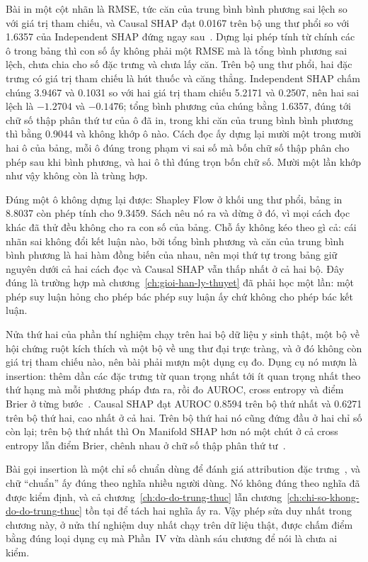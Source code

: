 Bài in một cột nhãn là RMSE, tức căn của trung bình bình phương sai lệch so với
giá trị tham chiếu, và Causal SHAP đạt 0.0167 trên bộ ung thư phổi so với
1.6357 của Independent SHAP đứng ngay sau~\autocite{p29causalshap}. Dựng lại
phép tính từ chính các ô trong bảng thì con số ấy không phải một RMSE mà là
tổng bình phương sai lệch, chưa chia cho số đặc trưng và chưa lấy căn. Trên bộ
ung thư phổi, hai đặc trưng có giá trị tham chiếu là hút thuốc và căng thẳng.
Independent SHAP chấm chúng 3.9467 và 0.1031 so với hai giá trị tham chiếu
5.2171 và 0.2507, nên hai sai lệch là $-1.2704$ và $-0.1476$; tổng bình phương
của chúng bằng 1.6357, đúng tới chữ số thập phân thứ tư của ô đã in, trong khi
căn của trung bình bình phương thì bằng 0.9044 và không khớp ô nào. Cách đọc ấy
dựng lại mười một trong mười hai ô của bảng, mỗi ô đúng trong phạm vi sai số mà
bốn chữ số thập phân cho phép sau khi bình phương, và hai ô thì đúng trọn bốn
chữ số. Mười một lần khớp như vậy không còn là trùng hợp.

Đúng một ô không dựng lại được: Shapley Flow ở khối ung thư phổi, bảng in
8.8037 còn phép tính cho 9.3459. Sách nêu nó ra và dừng ở đó, vì mọi cách đọc
khác đã thử đều không cho ra con số của bảng. Chỗ ấy không kéo theo gì cả: cái
nhãn sai không đổi kết luận nào, bởi tổng bình phương và căn của trung bình
bình phương là hai hàm đồng biến của nhau, nên mọi thứ tự trong bảng giữ nguyên
dưới cả hai cách đọc và Causal SHAP vẫn thấp nhất ở cả hai bộ. Đây đúng là
trường hợp mà chương~\ref{ch:gioi-han-ly-thuyet} đã phải học một lần: một phép
suy luận hỏng cho phép bác phép suy luận ấy chứ không cho phép bác kết luận.

%
Nửa thứ hai của phần thí nghiệm chạy trên hai bộ dữ liệu y sinh thật, một bộ về
hội chứng ruột kích thích và một bộ về ung thư đại trực tràng, và ở đó không
còn giá trị tham chiếu nào, nên bài phải mượn một dụng cụ đo. Dụng cụ nó mượn
là insertion: thêm dần các đặc trưng từ quan trọng nhất tới ít quan trọng nhất
theo thứ hạng mà mỗi phương pháp đưa ra, rồi đo AUROC, cross entropy và điểm
Brier ở từng bước~\autocite{p29causalshap}. Causal SHAP đạt AUROC 0.8594 trên
bộ thứ nhất và 0.6271 trên bộ thứ hai, cao nhất ở cả hai. Trên bộ thứ hai nó
cũng đứng đầu ở hai chỉ số còn lại; trên bộ thứ nhất thì On Manifold SHAP hơn
nó một chút ở cả cross entropy lẫn điểm Brier, chênh nhau ở chữ số thập phân
thứ tư~\autocite{p29causalshap}.

Bài gọi insertion là một chỉ số chuẩn dùng để đánh giá attribution đặc
trưng~\autocite{p29causalshap}, và chữ \enquote{chuẩn} ấy đúng theo nghĩa nhiều
người dùng. Nó không đúng theo nghĩa đã được kiểm định, và cả
chương~\ref{ch:do-do-trung-thuc} lẫn
chương~\ref{ch:chi-so-khong-do-do-trung-thuc} tồn tại để tách hai nghĩa ấy ra.
Vậy phép sửa duy nhất trong chương này, ở nửa thí nghiệm duy nhất chạy trên dữ
liệu thật, được chấm điểm bằng đúng loại dụng cụ mà Phần~IV vừa dành sáu chương
để nói là chưa ai kiểm.

%
